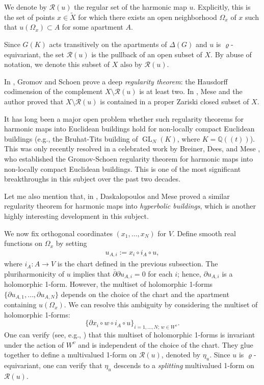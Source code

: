 \documentclass[english]{amsproc}
\theoremstyle{plain}
\theoremstyle{definition}
\theoremstyle{remark}
\theoremstyle{plain}
\numberwithin{equation}{thm} %
\begin{document}
We denote by $\mathcal{R}(u)$ the regular set of the harmonic map $u$. Explicitly, this is the set of points $x\in \widetilde{X}$ for which there exists an open neighborhood $\Omega_{x}$ of $x$ such that $u(\Omega_{x})\subset A$ for some apartment $A$. 

Since $G(K)$ acts transitively on the apartments of $\Delta(G)$ and $u$ is $\varrho$-equivariant, the set $\mathcal{R}(u)$ is the pullback of an open subset of $X$. By abuse of notation, we denote this subset of $X$ also by $\mathcal{R}(u)$.

In \cite{GS92}, Gromov and Schoen prove a   deep \emph{regularity theorem}: the Hausdorff codimension of the complement $X\setminus \mathcal{R}(u)$ is at least two. In \cite{DM24},   Mese  and the author proved that $X\setminus \mathcal{R}(u)$ is contained in a proper Zariski closed subset of $X$. 

It has long been a major open problem whether such regularity theorems for harmonic maps into Euclidean buildings hold for non-locally compact Euclidean buildings (e.g., the Bruhat-Tits building of $\operatorname{GL}_{N}(K)$, where $K=\mathbb{Q}((t))$). This was only recently resolved in a celebrated work by Breiner, Dees, and Mese \cite{BDM24}, who established the Gromov-Schoen regularity theorem for harmonic maps into {non-locally compact} Euclidean buildings.  
This is  one of the most significant breakthroughs in this subject over the past two decades. 

Let me also mention that, in \cite{DM21G}, Daskalopoulos and Mese proved a  similar regularity theorem for harmonic maps into \emph{hyperbolic buildings}, which is another highly interesting development in this subject.  

\medspace


We now fix orthogonal coordinates $(x_1,\ldots,x_N)$ for $V$. Define smooth real functions on $\Omega_x$ by setting
\begin{align}\label{eq:ui}
	u_{A,i} := x_i \circ i_A \circ u,
\end{align}
where $i_A:A\to V$ is the chart defined in the previous subsection. The pluriharmonicity of $u$ implies that $\bar{\partial}\partial u_{A,i}=0$ for each $i$; hence, $\partial u_{A,i}$ is a holomorphic 1-form. However, the multiset of holomorphic 1-forms $\{\partial u_{A,1},\ldots,\partial u_{A,N}\}$ depends on the choice of the chart and the apartment containing $u(\Omega_x)$. We can resolve this ambiguity by considering the multiset of holomorphic 1-forms:
$$
\{\partial x_i \circ w \circ i_{A}\circ u\}_{i=1,\ldots,N; \, w\in W^v}.
$$
One can verify (see, e.g., \cite{BDDM,CDY22}) that this multiset of holomorphic 1-forms is invariant under the action of $W^v$ and is independent of the choice of the chart. They glue together to define a multivalued 1-form on $\mathcal{R}(u)$, denoted by $\eta_u$. Since $u$ is $\varrho$-equivariant, one can verify that $\eta_u$ descends to a \emph{splitting} multivalued 1-form on $\mathcal{R}(u)$.
\end{document}
